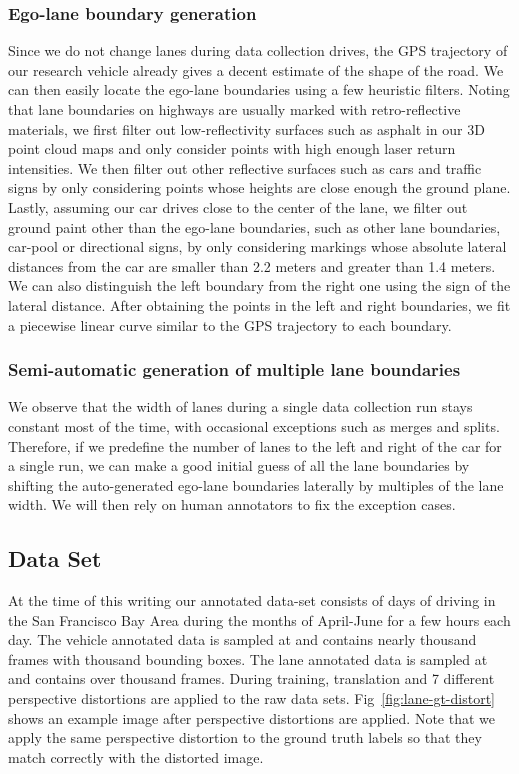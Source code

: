 \documentclass[journal]{IEEEtran}
\begin{document}
\subsubsection{Ego-lane boundary generation}
Since we do not change lanes during data collection drives, the GPS trajectory of our research vehicle already gives a decent estimate of the shape of the road. We can then easily locate the ego-lane boundaries using a few heuristic filters. Noting that lane boundaries on highways are usually marked with retro-reflective materials, we first filter out low-reflectivity surfaces such as asphalt in our 3D point cloud maps and only consider points with high enough laser return intensities. We then filter out other reflective surfaces such as cars and traffic signs by only considering points whose heights are close enough the ground plane.  Lastly, assuming our car drives close to the center of the lane, we filter out ground paint other than the ego-lane boundaries, such as other lane boundaries, car-pool or directional signs, by only considering markings whose absolute lateral distances from the car are smaller than 2.2 meters and greater than 1.4 meters. We can also distinguish the left boundary from the right one using the sign of the lateral distance. After obtaining the points in the left and right boundaries, we fit a piecewise linear curve similar to the GPS trajectory to each boundary.
 
\subsubsection{Semi-automatic generation of multiple lane boundaries}
We observe that the width of lanes during a single data collection run stays constant most of the time, with occasional exceptions such as merges and splits. Therefore, if we predefine the number of lanes to the left and right of the car for a single run, we can make a good initial guess of all the lane boundaries by shifting the auto-generated ego-lane boundaries laterally by multiples of the lane width. We will then rely on human annotators to fix the exception cases.
 
\subsection{Data Set}
At the time of this writing our annotated data-set consists of  days of driving in the San Francisco Bay Area during the months of April-June for a few hours each day. The vehicle annotated data is sampled at  and contains nearly  thousand frames with  thousand bounding boxes. The lane annotated data is sampled at  and contains over  thousand frames. During training, translation and 7 different perspective distortions are applied to the raw data sets. Fig~\ref{fig:lane-gt-distort} shows an example image after perspective distortions are applied. Note that we apply the same perspective distortion to the ground truth labels so that they match correctly with the distorted image.
\end{document}
